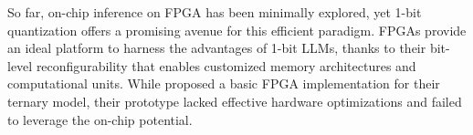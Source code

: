 So far, on-chip inference on FPGA has been minimally explored, yet 1-bit quantization offers a promising avenue for this efficient paradigm. FPGAs provide an ideal platform to harness the advantages of 1-bit LLMs, thanks to their bit-level reconfigurability that enables customized memory architectures and computational units. While \cite{scalable} proposed a basic FPGA implementation for their ternary model, their prototype lacked effective hardware optimizations and failed to leverage the on-chip potential. 



